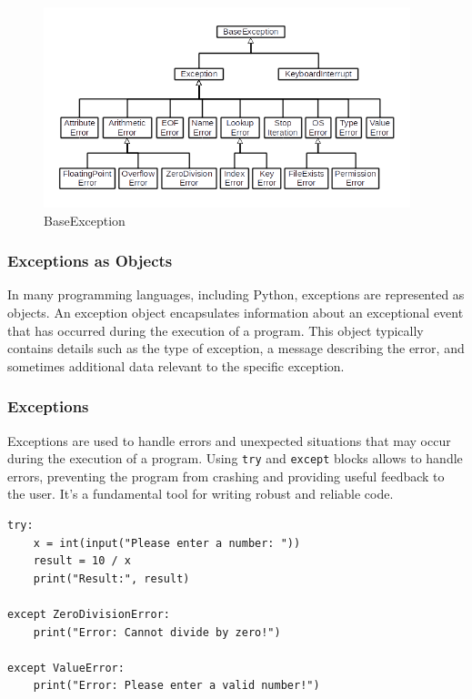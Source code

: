 \begin{figure}[h!]
    \centering
    \includegraphics[width=0.95\textwidth]{images/exceptions.png}
    \caption{BaseException}
    \label{fig:example-3}
\end{figure}

\subsubsection{Exceptions as Objects}
In many programming languages, including Python, exceptions are represented as objects. An exception object encapsulates information about an exceptional event that has occurred during the execution of a program. This object typically contains details such as the type of exception, a message describing the error, and sometimes additional data relevant to the specific exception.

\newpage
\subsubsection{Exceptions}
Exceptions are used to handle errors and unexpected situations that may occur during the execution of a program. Using \texttt{try} and \texttt{except} blocks allows to handle errors, preventing the program from crashing and providing useful feedback to the user. It's a fundamental tool for writing robust and reliable code.
\begin{codebox}
\begin{verbatim}
try:
    x = int(input("Please enter a number: "))
    result = 10 / x
    print("Result:", result)
    
except ZeroDivisionError:
    print("Error: Cannot divide by zero!")
    
except ValueError:
    print("Error: Please enter a valid number!")
\end{verbatim}
\end{codebox}

